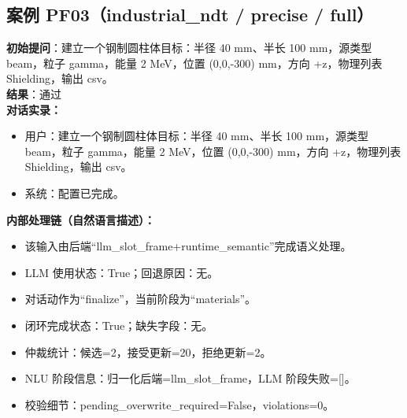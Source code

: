 \documentclass[11pt]{ctexart}
\begin{document}
\subsection{案例 PF03（industrial\_ndt / precise / full）}
\textbf{初始提问}：建立一个钢制圆柱体目标：半径 40 mm、半长 100 mm，源类型 beam，粒子 gamma，能量 2 MeV，位置 (0,0,-300) mm，方向 +z，物理列表 Shielding，输出 csv。\\
\textbf{结果}：通过\\
\textbf{对话实录：}
\begin{itemize}
\item 用户：建立一个钢制圆柱体目标：半径 40 mm、半长 100 mm，源类型 beam，粒子 gamma，能量 2 MeV，位置 (0,0,-300) mm，方向 +z，物理列表 Shielding，输出 csv。
\item 系统：配置已完成。
\end{itemize}
\textbf{内部处理链（自然语言描述）：}
\begin{itemize}
\item 该输入由后端“llm\_slot\_frame+runtime\_semantic”完成语义处理。
\item LLM 使用状态：True；回退原因：无。
\item 对话动作为“finalize”，当前阶段为“materials”。
\item 闭环完成状态：True；缺失字段：无。
\item 仲裁统计：候选=2，接受更新=20，拒绝更新=2。
\item NLU 阶段信息：归一化后端=llm\_slot\_frame，LLM 阶段失败=[]。
\item 校验细节：pending\_overwrite\_required=False，violations=0。
\end{itemize}
\end{document}
